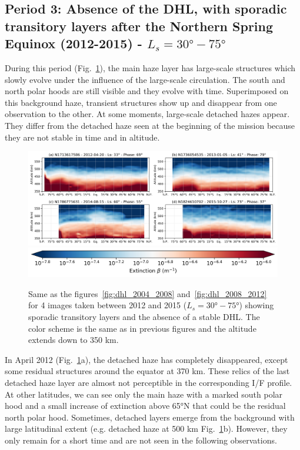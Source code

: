 \subsection{Period 3: Absence of the DHL, with sporadic transitory layers after the Northern Spring Equinox (2012-2015) - $L_s=\ang{30}-\ang{75}$}

During this period (Fig.~\ref{fig:dhl_2012_2015}), the main haze layer has large-scale structures which slowly evolve under the influence of the
large-scale circulation. The south and north polar hoods are still visible and they evolve
with time. Superimposed on this background haze, transient structures show up and disappear from one observation
to the other. At some moments, large-scale detached hazes appear. They differ from the detached haze seen at the
beginning of the mission because they are not stable in time and in altitude.

\begin{figure}[!ht]
    \centering
    \includegraphics[width=\textwidth]{Fig/Lat_beta-2012_2015.png}
    \includegraphics[width=.5\textwidth]{Fig/Extinction_colorbar.png}\vspace{-.3cm}
    \caption{Same as the figures~\ref{fig:dhl_2004_2008} and~\ref{fig:dhl_2008_2012}
    for 4 images taken between 2012 and 2015 ($L_s=\ang{30}-\ang{75}$) showing sporadic
    transitory layers and the absence of a stable DHL.
    The color scheme is the same as in previous figures and the altitude extends down to 350 km.}
    \label{fig:dhl_2012_2015}
\end{figure}

In April 2012 (Fig.~\ref{fig:dhl_2012_2015}a), the detached haze has completely disappeared, except some residual
structures around the equator at 370 km.
These relics of the last detached haze layer are almost not perceptible in the corresponding I/F profile. At other
latitudes, we can see only the main haze with a marked south polar hood and a small increase of extinction above
\ang{65}N that could be the residual north polar hood. Sometimes, detached layers emerge from the background with large latitudinal
extent (e.g. detached haze at 500 km Fig.~\ref{fig:dhl_2012_2015}b). However, they only remain for a short time
and are not seen in the following observations.

